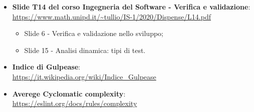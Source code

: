 \begin{itemize}
	\item \textbf{Slide T14 del corso Ingegneria del Software - Verifica e validazione}:\\
	\textcolor{blue}{\url{https://www.math.unipd.it/~tullio/IS-1/2020/Dispense/L14.pdf}}
	\begin{itemize}
		\item Slide 6 - Verifica e validazione nello sviluppo; 
		\item Slide 15 - Analisi dinamica: tipi di test.
	\end{itemize}
	
	\item \textbf{Indice di Gulpease}:\\
	\textcolor{blue}{\url{https://it.wikipedia.org/wiki/Indice_Gulpease}}
	
	\item \textbf{Averege Cyclomatic complexity}:\\
	\textcolor{blue}{\url{https://eslint.org/docs/rules/complexity}}
	
\end{itemize}